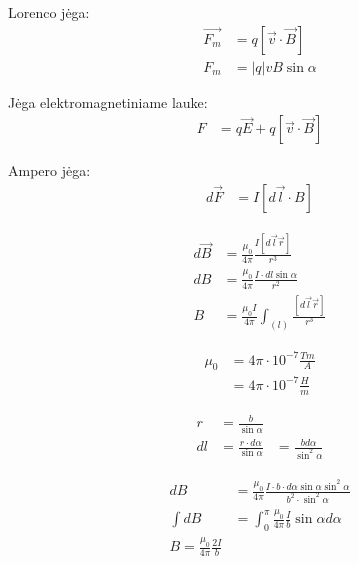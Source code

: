 Lorenco jėga:
\begin{align*}
  \vec{F_{m}} &= q [\vec{v} \cdot \vec{B}] \\
  F_{m} &= |q|vB \sin \alpha
\end{align*}

Jėga elektromagnetiniame lauke:
\begin{align*}
  F &= q \vec{E} + q \left[ \vec{v} \cdot \vec{B} \right]
\end{align*}

Ampero jėga:
\begin{align*}
  d \vec{F} &= I \left[ d\vec{l} \cdot B \right]
\end{align*}

\begin{align*}
  d \vec{B} &= \frac{\mu_{0}}{4\pi} \frac{I [d \vec{l}\vec{r}]}{r^{3}} \\
  dB &= \frac{\mu_{0}}{4\pi} \frac{I\cdot dl \sin \alpha}{r^{2}} \\
  B &= \frac{\mu_{0}I}{4\pi}
    \int _{(l)} \frac{\left[ d\vec{l} \vec{r} \right]}{r^{3}}
\end{align*}

\begin{align*}
  \mu_{0} &= 4 \pi \cdot 10^{-7} \tfrac{Tm}{A} \\
  &= 4 \pi \cdot 10 ^{-7} \tfrac{H}{m}
\end{align*}

\begin{align*}
  r &= \frac{b}{\sin \alpha} \\
  dl &= \frac{r \cdot d \alpha}{\sin \alpha}
  &= \frac{b d \alpha}{\sin ^{2} \alpha}
\end{align*}

\begin{align*}
  dB &= \frac{\mu_{0}}{4\pi}
    \frac{I \cdot b \cdot d\alpha \sin \alpha \sin ^{2} \alpha}{
      b^{2} \cdot \sin ^{2} \alpha} \\
  \int dB &= \int _{0} ^{\pi} \frac{\mu_{0}}{4\pi} 
    \frac{I}{b} \sin \alpha d \alpha \\
  B = \frac{\mu_{0}}{4\pi} \frac{2I}{b}
\end{align*}

